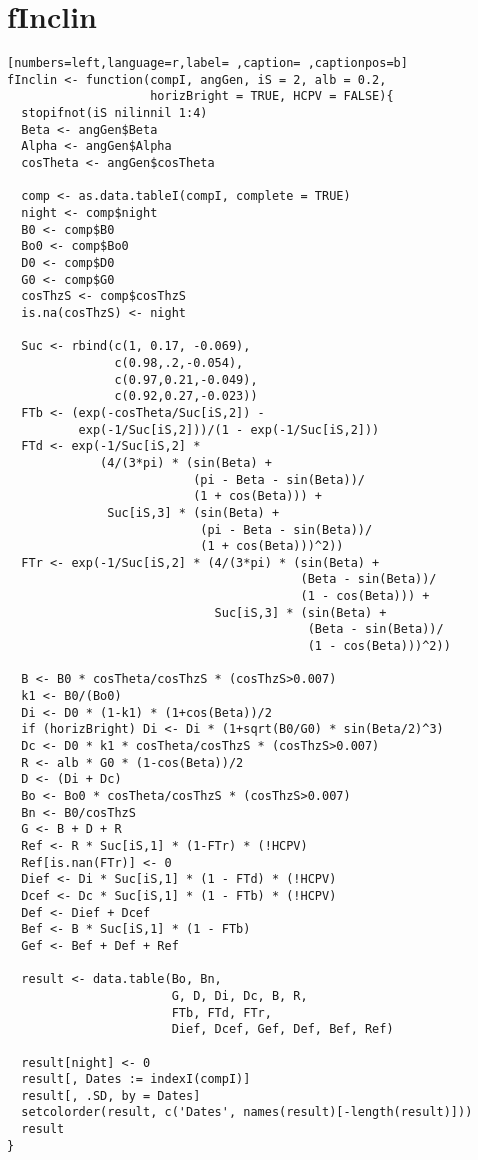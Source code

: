 \section{fInclin}
\label{sec:orge5a0f1b}
\begin{lstlisting}[numbers=left,language=r,label= ,caption= ,captionpos=b]
fInclin <- function(compI, angGen, iS = 2, alb = 0.2,
                    horizBright = TRUE, HCPV = FALSE){
  stopifnot(iS nilinnil 1:4)
  Beta <- angGen$Beta
  Alpha <- angGen$Alpha
  cosTheta <- angGen$cosTheta

  comp <- as.data.tableI(compI, complete = TRUE)
  night <- comp$night
  B0 <- comp$B0
  Bo0 <- comp$Bo0
  D0 <- comp$D0
  G0 <- comp$G0
  cosThzS <- comp$cosThzS
  is.na(cosThzS) <- night

  Suc <- rbind(c(1, 0.17, -0.069),
               c(0.98,.2,-0.054),
               c(0.97,0.21,-0.049),
               c(0.92,0.27,-0.023))
  FTb <- (exp(-cosTheta/Suc[iS,2]) -
          exp(-1/Suc[iS,2]))/(1 - exp(-1/Suc[iS,2]))
  FTd <- exp(-1/Suc[iS,2] *
             (4/(3*pi) * (sin(Beta) +
                          (pi - Beta - sin(Beta))/
                          (1 + cos(Beta))) +
              Suc[iS,3] * (sin(Beta) +
                           (pi - Beta - sin(Beta))/
                           (1 + cos(Beta)))^2))
  FTr <- exp(-1/Suc[iS,2] * (4/(3*pi) * (sin(Beta) +
                                         (Beta - sin(Beta))/
                                         (1 - cos(Beta))) +
                             Suc[iS,3] * (sin(Beta) +
                                          (Beta - sin(Beta))/
                                          (1 - cos(Beta)))^2))

  B <- B0 * cosTheta/cosThzS * (cosThzS>0.007) 
  k1 <- B0/(Bo0)
  Di <- D0 * (1-k1) * (1+cos(Beta))/2
  if (horizBright) Di <- Di * (1+sqrt(B0/G0) * sin(Beta/2)^3)
  Dc <- D0 * k1 * cosTheta/cosThzS * (cosThzS>0.007)
  R <- alb * G0 * (1-cos(Beta))/2
  D <- (Di + Dc)
  Bo <- Bo0 * cosTheta/cosThzS * (cosThzS>0.007) 
  Bn <- B0/cosThzS
  G <- B + D + R
  Ref <- R * Suc[iS,1] * (1-FTr) * (!HCPV)
  Ref[is.nan(FTr)] <- 0 
  Dief <- Di * Suc[iS,1] * (1 - FTd) * (!HCPV)
  Dcef <- Dc * Suc[iS,1] * (1 - FTb) * (!HCPV)
  Def <- Dief + Dcef
  Bef <- B * Suc[iS,1] * (1 - FTb)
  Gef <- Bef + Def + Ref

  result <- data.table(Bo, Bn,
                       G, D, Di, Dc, B, R,
                       FTb, FTd, FTr,
                       Dief, Dcef, Gef, Def, Bef, Ref) 

  result[night] <- 0
  result[, Dates := indexI(compI)]
  result[, .SD, by = Dates]
  setcolorder(result, c('Dates', names(result)[-length(result)]))
  result
}
\end{lstlisting}
